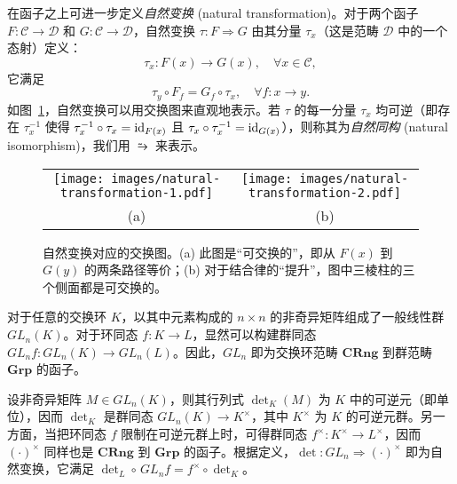 在函子之上可进一步定义\emph{自然变换} (natural transformation)。对于两个函子 $F\colon\mathcal{C}\to\mathcal{D}$ 和 $G\colon\mathcal{C}\to\mathcal{D}$，自然变换 $\tau\colon F\Rightarrow G$ 由其分量 $\tau_x$（这是范畴 $\mathcal{D}$ 中的一个态射）定义：
\begin{equation}
  \tau_x\colon F(x)\to G(x), \quad \forall x\in\mathcal{C},
\end{equation}
它满足
\begin{equation}
  \tau_y \circ F_f = G_f \circ \tau_x, \quad \forall f\colon x\to y.
\end{equation}
如图~\ref{fig:natural-transformation}，自然变换可以用交换图来直观地表示。若 $\tau$ 的每一分量 $\tau_x$ 均可逆（即存在 $\tau_x^{-1}$ 使得 $\tau^{-1}_x\circ\tau_x=\mathrm{id}_{F(x)}$ 且 $\tau_x\circ\tau^{-1}_x = \mathrm{id}_{G(x)}$），则称其为\emph{自然同构} (natural isomorphism)，我们用 $\similarrightarrow$ 来表示。

\begin{figure}[htb]
  \centering
  \begin{tabular}{c@{\qquad}c}
    \texttt{[image: images/natural-transformation-1.pdf]} &
    \texttt{[image: images/natural-transformation-2.pdf]} \\
    (a) & (b)
  \end{tabular}
  \caption[自然变换对应的交换图]{自然变换对应的交换图。(a) 此图是“可交换的”，即从 $F(x)$ 到 $G(y)$ 的两条路径等价；(b) 对于结合律的“提升”，图中三棱柱的三个侧面都是可交换的。}
  \label{fig:natural-transformation}
\end{figure}

\begin{example}
  对于任意的交换环 $K$，以其中元素构成的 $n\times n$ 的非奇异矩阵组成了一般线性群 $GL_n(K)$。对于环同态 $f\colon K\to L$，显然可以构建群同态 $GL_n f\colon GL_n(K)\to GL_n(L)$。因此，$GL_n$ 即为交换环范畴 $\mathbf{CRng}$ 到群范畴 $\mathbf{Grp}$ 的函子。

  设非奇异矩阵 $M\in GL_n(K)$，则其行列式 $\det_K(M)$ 为 $K$ 中的可逆元（即单位），因而 $\det_K$ 是群同态 $GL_n(K)\to K^\times$，其中 $K^\times$ 为 $K$ 的可逆元群。另一方面，当把环同态 $f$ 限制在可逆元群上时，可得群同态 $f^\times\colon K^\times\to L^\times$，因而 $(\cdot)^\times$ 同样也是 $\mathbf{CRng}$ 到 $\mathbf{Grp}$ 的函子。根据定义，$\det\colon GL_n\Rightarrow(\cdot)^\times$ 即为自然变换，它满足 $\det_L\circ\,GL_n f=f^\times\circ \det_K$。
\end{example}


